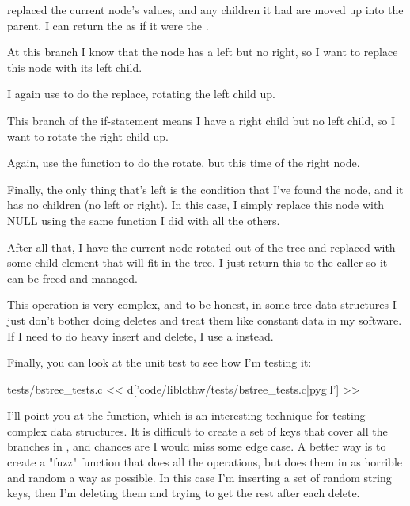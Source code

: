 \begin{description}
    replaced the current node's values, and any children it had are moved up
    into the parent.  I can return the  as if it were the
    .
\item[bstree.c:218] At this branch I know that the node has a left but no right, so
    I want to replace this node with its left child.
\item[bstree.c:219] I again use  to do the
    replace, rotating the left child up.
\item[bstree.c:220] This branch of the if-statement means I have a right child but 
    no left child, so I want to rotate the right child up.
\item[bstree.c:221] Again, use the function to do the rotate, but this time of the
    right node.
\item[bstree.c:222] Finally, the only thing that's left is the condition
    that I've found the node, and it has no children (no left or right).
    In this case, I simply replace this node with NULL using the same
    function I did with all the others.
\item[bstree.c:210] After all that, I have the current node rotated out of the tree
    and replaced with some child element that will fit in the tree.  I just
    return this to the caller so it can be freed and managed.
\end{description}

This operation is very complex, and to be honest, in some tree data structures
I just don't bother doing deletes and treat them like constant data in my 
software.  If I need to do heavy insert and delete, I use a 
instead.

Finally, you can look at the unit test to see how I'm testing it:

\begin{code}{tests/bstree\_tests.c}
<< d['code/liblcthw/tests/bstree_tests.c|pyg|l'] >>
\end{code}

I'll point you at the  function, which is an interesting
technique for testing complex data structures.  It is difficult to create a
set of keys that cover all the branches in , and
chances are I would miss some edge case.  A better way is to create a "fuzz"
function that does all the operations, but does them in as horrible and random
a way as possible.  In this case I'm inserting a set of random string keys,
then I'm deleting them and trying to get the rest after each delete.

